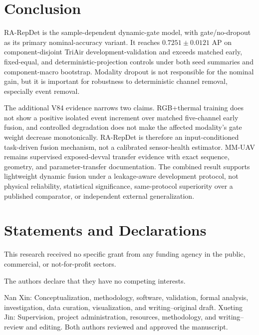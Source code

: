 \section{Conclusion}
RA-RepDet is the sample-dependent dynamic-gate model, with gate/no-dropout as its primary nominal-accuracy variant. It reaches $0.7251\pm0.0121$ AP on component-disjoint TriAir development-validation and exceeds matched early, fixed-equal, and deterministic-projection controls under both seed summaries and component-macro bootstrap. Modality dropout is not responsible for the nominal gain, but it is important for robustness to deterministic channel removal, especially event removal.

The additional V84 evidence narrows two claims. RGB+thermal training does not show a positive isolated event increment over matched five-channel early fusion, and controlled degradation does not make the affected modality's gate weight decrease monotonically. RA-RepDet is therefore an input-conditioned task-driven fusion mechanism, not a calibrated sensor-health estimator. MM-UAV remains supervised exposed-devval transfer evidence with exact sequence, geometry, and parameter-transfer documentation. The combined result supports lightweight dynamic fusion under a leakage-aware development protocol, not physical reliability, statistical significance, same-protocol superiority over a published comparator, or independent external generalization.

\section*{Statements and Declarations}
This research received no specific grant from any funding agency in the public, commercial, or not-for-profit sectors.

The authors declare that they have no competing interests.

Nan Xin: Conceptualization, methodology, software, validation, formal analysis, investigation, data curation, visualization, and writing--original draft. Xueting Jin: Supervision, project administration, resources, methodology, and writing--review and editing. Both authors reviewed and approved the manuscript.

